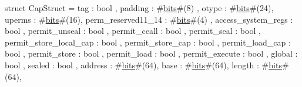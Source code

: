 struct CapStruct = {
  tag                     : bool    ,
  padding                 : #\hyperref[zbits]{bits}#(8) ,
  otype                   : #\hyperref[zbits]{bits}#(24),
  uperms                  : #\hyperref[zbits]{bits}#(16),
  perm_reserved11_14      : #\hyperref[zbits]{bits}#(4) ,
  access_system_regs      : bool    ,
  permit_unseal           : bool    ,
  permit_ccall            : bool    ,
  permit_seal             : bool    ,
  permit_store_local_cap  : bool    ,
  permit_store_cap        : bool    ,
  permit_load_cap         : bool    ,
  permit_store            : bool    ,
  permit_load             : bool    ,
  permit_execute          : bool    ,
  global                  : bool    ,
  sealed                  : bool    ,
  address                 : #\hyperref[zbits]{bits}#(64),
  base                    : #\hyperref[zbits]{bits}#(64),
  length                  : #\hyperref[zbits]{bits}#(64),
}
